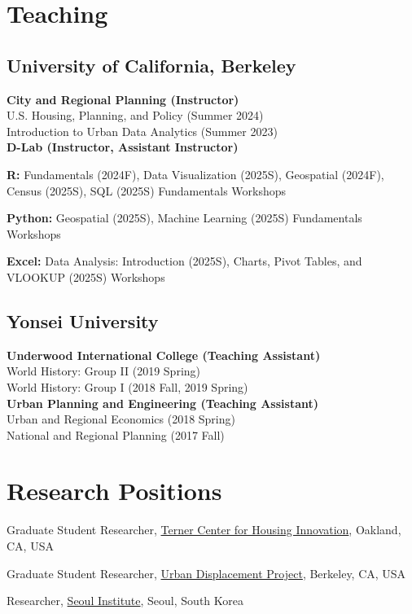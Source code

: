 \documentclass[12pt,letterpaper]{report}
\newcommand{\listitemspace}{0.4em}
\renewenvironment{itemize}
{\begin{list}{}{\setlength{\leftmargin}{0.5em}
                \setlength{\parskip}{0em}
                \setlength{\itemsep}{\listitemspace}
                \setlength{\parsep}{\listitemspace}}}
{\end{list}}
\begin{document}
 \section*{Teaching}
    \subsection*{University of California, Berkeley}
    \textbf{City and Regional Planning  (Instructor)}\\
      U.S. Housing, Planning, and Policy (Summer 2024)\\
      Introduction to Urban Data Analytics (Summer 2023)\\[0.6em]
    \textbf{D-Lab (Instructor, Assistant Instructor)} 
    \vspace{-0.5em}
      \begin{itemize}
      \addtolength{\leftskip}{0em} 
      \setlength{\itemsep}{-0.2em}
      \item[•] \textbf{R:} Fundamentals (2024F), Data Visualization (2025S), Geospatial (2024F), Census  (2025S), SQL (2025S) Fundamentals Workshops
      \item[•] \textbf{Python:} Geospatial (2025S), Machine Learning (2025S) Fundamentals Workshops
      \item[•] \textbf{Excel:} Data Analysis: Introduction (2025S), Charts, Pivot Tables, and VLOOKUP (2025S) Workshops
    \end{itemize}

   \subsection*{Yonsei University}
   \textbf{Underwood International College (Teaching Assistant)}\\ 
    World History: Group II (2019 Spring)\\
    World History: Group I  (2018 Fall, 2019 Spring)\\[0.6em]
  \textbf{Urban Planning and Engineering (Teaching Assistant)}\\ 
    Urban and Regional Economics (2018 Spring)\\
    National and Regional Planning (2017 Fall)

  \section*{Research Positions}
    \begin{tablist}
        \item[2023-] \tab{}Graduate Student Researcher, \href{https://ternercenter.berkeley.edu/}{Terner Center for Housing Innovation}, Oakland, CA, USA
        \item[2021-2023] \tab{}Graduate Student Researcher, \href{https://www.urbandisplacement.org/}{Urban Displacement Project}, Berkeley, CA, USA
        \item[2019-2021] \tab{}Researcher, \href{si.re.kr}{Seoul Institute}, Seoul, South Korea
    \end{tablist}
\end{document}
